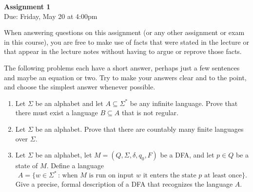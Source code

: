 \documentclass[11pt]{article}
\newenvironment{mylist}[1]{\begin{list}{}{
	\setlength{\leftmargin}{#1}
	\setlength{\rightmargin}{0mm}
	\setlength{\labelsep}{2mm}
	\setlength{\labelwidth}{8mm}
	\setlength{\itemsep}{0mm}}}
	{\end{list}}
\newcounter{questioncounter}
\newenvironment{question}{
  \begin{mylist}{\parindent}
  \item[\stepcounter{questioncounter}
    \thequestioncounter.]}{
\end{mylist}}
\begin{document}
\pagestyle{plain}
\thispagestyle{fancy}
\cfoot{\thepage} 
\renewcommand{\headrulewidth}{0pt}
\renewcommand{\footrulewidth}{0pt}

\begin{center}
  \rule{0mm}{9mm}
  {\Large\bf Assignment 1}\\[2mm]
  Due: Friday, May 20 at 4:00pm
\end{center}


\noindent
When answering questions on this assignment (or any other assignment or exam in
this course), you are free to make use of facts that were stated in the lecture
or that appear in the lecture notes without having to argue or reprove those
facts.


\begin{question}[6 points]
  The following problems each have a short answer, perhaps just a few
  sentences and maybe an equation or two.
  Try to make your answers clear and to the point, and choose the simplest
  answer whenever possible.

  \begin{enumerate}
  \item[(a)]
    Let $\Sigma$ be an alphabet and let $A\subseteq\Sigma^{\ast}$ be any
    infinite language.
    Prove that there must exist a language $B\subseteq A$ that is not regular.
  \item[(b)]
    Let $\Sigma$ be an alphabet.
    Prove that there are countably many finite languages over $\Sigma$.
  \item[(c)]
    Let $\Sigma$ be an alphabet, let $M = (Q,\Sigma,\delta,q_0,F)$ be a DFA,
    and let $p\in Q$ be a state of $M$.
    Define a language
    \[
    A = \bigl\{
    w\in\Sigma^{\ast}\,:\,
    \text{when $M$ is run on input $w$ it enters the state $p$ at least once}
    \bigr\}.
    \]
    Give a precise, formal description of a DFA that recognizes the language
    $A$.

  \end{enumerate}
\end{question}

\end{document}
